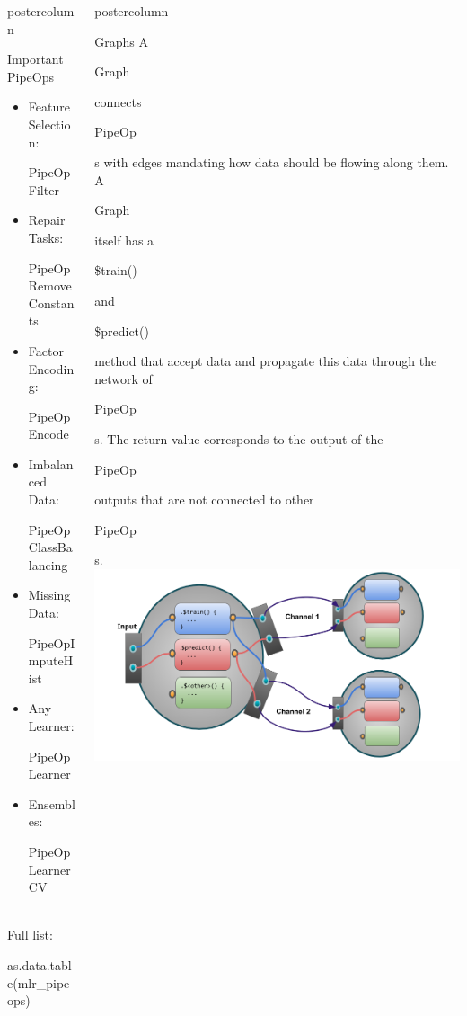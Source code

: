 \documentclass{beamer}
\newlength{\columnheight} %
\newcommand{\codeinline}[1]{\begin{codeboxinline}#1\end{codeboxinline}}
\begin{document}
\begin{frame}[fragile]{}
\begin{columns}
\begin{column}{.245\textwidth}
\begin{beamercolorbox}[center]{postercolumn}
\begin{minipage}{.98\textwidth}
{\begin{myblock}{Important PipeOps}
\begin{itemize}
                \item Feature Selection: \codeinline{PipeOpFilter}
                \item Repair Tasks: \codeinline{PipeOpRemoveConstants}
                \item Factor Encoding: \codeinline{PipeOpEncode}
                \item Imbalanced Data: \codeinline{PipeOpClassBalancing}
                \item Missing Data: \codeinline{PipeOpImputeHist}
                \item Any Learner: \codeinline{PipeOpLearner}
                \item Ensembles: \codeinline{PipeOpLearnerCV}
              \end{itemize}
              \ \\
              Full list: \codeinline{as.data.table(mlr\_pipeops)}
						\end{myblock}
						\vfill}
				\end{minipage}
			\end{beamercolorbox}
		\end{column}
		\begin{column}{.245\textwidth}
			\begin{beamercolorbox}[center]{postercolumn}
				\begin{minipage}{.98\textwidth}
					\parbox[t][\columnheight]{\textwidth}{
						\begin{myblock}{Graphs}
              A \codeinline{Graph} connects \codeinline{PipeOp}s with edges mandating how data should be flowing along them. A \codeinline{Graph} itself has a \codeinline{\$train()} and \codeinline{\$predict()} method that accept data and propagate this data through the network of \codeinline{PipeOp}s. The return value corresponds to the output of the \codeinline{PipeOp} outputs that are not connected to other \codeinline{PipeOp}s.\\
              \includegraphics[width=\textwidth]{img/po_multi_viz.png}

\end{myblock}}
\end{minipage}
\end{beamercolorbox}
\end{column}
\end{columns}
\end{frame}
\end{document}
